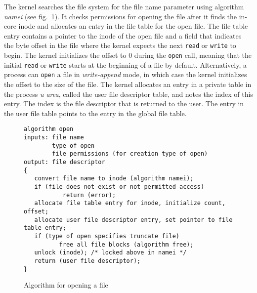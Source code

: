 The kernel searches the file system for the file name parameter using algorithm
\emph{namei} (see fig.~\ref{fig:open}). It checks permissions for opening the file after
it finds the in-core inode and allocates an entry in the file table for the open file. The
file table entry contains a pointer to the inode of the open file and a field that
indicates the byte offset in the file where the kernel expects the next \texttt{read} or
\texttt{write} to begin. The kernel initializes the offset to 0 during the \texttt{open}
call, meaning that the initial \texttt{read} or \texttt{write} starts at the beginning of
a file by default. Alternatively, a process can \texttt{open} a file in
\emph{write-append} mode, in which case the kernel initializes the offset to the size of
the file. The kernel allocates an entry in a private table in the process \emph{u area},
called the user file descriptor table, and notes the index of this entry. The index is the
file descriptor that is returned to the user. The entry in the user file table points to
the entry in the global file table.

\begin{figure}[h]
  \centering
  \begin{minipage}[h]{.8\linewidth}
\begin{verbatim}
algorithm open
inputs: file name
        type of open
        file permissions (for creation type of open)
output: file descriptor
{
   convert file name to inode (algorithm namei);
   if (file does not exist or not permitted access)
           return (error);
   allocate file table entry for inode, initialize count, offset;
   allocate user file descriptor entry, set pointer to file table entry;
   if (type of open specifies truncate file)
          free all file blocks (algorithm free);
   unlock (inode); /* locked above in namei */
   return (user file descriptor);
}
\end{verbatim}
  \end{minipage}
  \caption{Algorithm for opening a file}
  \label{fig:open}
\end{figure}

